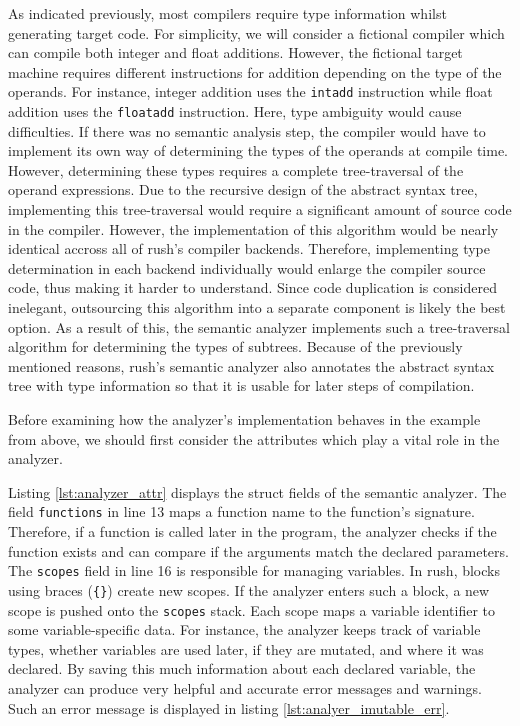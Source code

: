 As indicated previously, most compilers require type information whilst
generating target code. For simplicity, we will consider a fictional compiler
which can compile both integer and float additions. However, the fictional
target machine requires different instructions for addition depending on the
type of the operands. For instance, integer addition uses the \texttt{intadd} instruction
while float addition uses the \texttt{floatadd} instruction. Here, type ambiguity would
cause difficulties. If there was no semantic analysis step, the compiler would
have to implement its own way of determining the types of the operands at
compile time. However, determining these types requires a complete
tree-traversal of the operand expressions. Due to the recursive design of the
abstract syntax tree, implementing this tree-traversal would require a
significant amount of source code in the compiler. However, the implementation
of this algorithm would be nearly identical accross all of rush's compiler
backends. Therefore, implementing type determination in each backend
individually would enlarge the compiler source code, thus making it harder to
understand. Since code duplication is considered inelegant, outsourcing this
algorithm into a separate component is likely the best option. As a result of
this, the semantic analyzer implements such a tree-traversal algorithm for
determining the types of subtrees. Because of the previously mentioned reasons,
rush's semantic analyzer also annotates the abstract syntax tree with type
information so that it is usable for later steps of compilation.

Before examining how the analyzer's implementation behaves in the example from above,
we should first consider the attributes which play a vital role in the analyzer.


Listing \ref{lst:analyzer_attr} displays the struct fields of the semantic analyzer.
The field \texttt{functions} in line 13 maps a function name to the function's signature.
Therefore, if a function is called later in the program, the analyzer checks if the function exists and can compare if the arguments match the declared parameters.
The \texttt{scopes} field in line 16 is responsible for managing variables.
In rush, blocks using braces (\texttt{\{\}}) create new scopes.
If the analyzer enters such a block, a new scope is pushed onto the \texttt{scopes} stack.
Each scope maps a variable identifier to some variable-specific data.
For instance, the analyzer keeps track of variable types, whether variables are used later, if they are mutated, and where it was declared.
By saving this much information about each declared variable, the analyzer can produce very helpful and accurate error messages and warnings.
Such an error message is displayed in listing \ref{lst:analyer_imutable_err}.


